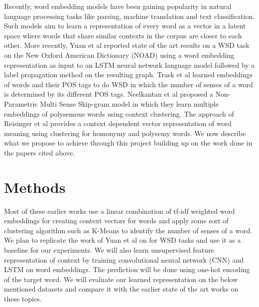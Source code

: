\documentclass{article}
\begin{document}
Recently, word embedding models \cite{mikolov2013efficient} have been gaining popularity in natural language processing tasks like parsing, machine translation and text classification. Such models aim to learn a representation of every word as a vector in a latent space where words that share similar contexts in the corpus are closer to each other. More recently, Yuan et al \cite{yuan2016word} reported state of the art results on a WSD task on the New Oxford American Dictionary (NOAD) using a word embedding representation as input to an LSTM neural network language model followed by a label propagation method on the resulting graph. Trask et al \cite{trask2015sense2vec} learned embeddings of words and their POS tags to do WSD in which the number of senses of a word is determined by its different POS tags. Neelkantan et al \cite{neelakantan2015efficient} proposed a Non-Parametric Multi Sense Skip-gram model in which they learn multiple embeddings of polysemous words using context clustering. The approach of Reisinger et al\cite{reisinger2010multi} provides a context dependent vector representation of word meaning using clustering for homonymy and polysemy words. We now describe what we propose to achieve through this project building up on the work done in the papers cited above.

\section{Methods}
Most of these earlier works use a linear combination of tf-idf weighted word embeddings for creating context vectors for words and apply some sort of clustering algorithm such as K-Means to identify the number of senses of a word. We plan to replicate the work of Yuan et al \cite{yuan2016word}on for WSD tasks and use it as a baseline for our experiments. We will also learn unsupervised feature representation of context by training convolutional neural network (CNN) and LSTM on word embeddings. The prediction will be done using one-hot encoding of the target word. We will evaluate our learned representation on the below mentioned datasets and compare it with the earlier state of the art works on these topics. 
\end{document}
